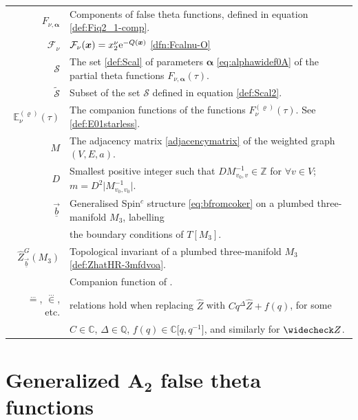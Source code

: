 \documentclass[10pt,a4paper]{amsart}
\def\BE{\mathbb{E}}
\def\CF{\mathcal{F}}
\def\CS{\mathcal{S}}
\def\ss{ \tilde{\mathcal{S}} }
\newcommand{\CC}{\mathbb{C}}
\newcommand{\QQ}{\mathbb{Q}}
\def\bos{\varrho}
\def\bal{\boldsymbol{\alpha}}
\theoremstyle{definition}
\numberwithin{equation}{section}
\begin{document}
\begin{table}[!ht]
\begin{tabular}{r l}
 $F_{\nu,\bal}$ & Components of false theta functions, defined in equation \eqref{def:Fiq2_1-comp}.
		\\
 $\CF_\nu$ & $\CF_\nu(\boldsymbol{x})=x_2^\nu {\rm e}^{-Q(\boldsymbol{x})}$ \eqref{dfn:Fcalnu-O} \\
		$\CS$ & The set \eqref{def:Scal} of parameters $\bal$ \eqref{eq:alphawidef0A} of the partial theta functions $F_{\nu,\bal}(\tau)$. \\
 $\ss$ & Subset of the set $\CS$ defined in equation \eqref{def:Scal2}.
		\\
		$\BE_\nu^{(\bos)}(\tau)$ & The companion functions of the functions $F_\nu^{(\bos)}(\tau)$. See \eqref{def:E01starless}.
 \\
		$M$ & The adjacency matrix \eqref{adjacencymatrix} of the weighted graph $(V,E,a)$.
		\\
		$D$ & Smallest positive integer such that $D M^{-1}_{v_0,v}\in\mathbb{Z}$ for $\forall  v\in V$; $m=D^2 \big|M^{-1}_{v_0,v_0}\big|$.
		\\
		$\vec{\underline{b}}$ & Generalised Spin$^c$ structure \eqref{eq:bfromcoker} on a plumbed three-manifold $M_3$, labelling \\
 & the boundary conditions of $T[M_3]$.
 \\
		$\widehat{Z}_{\vec{\underline{b}}}^G(M_3)$ & Topological invariant of a plumbed three-manifold $M_3$ \eqref{def:ZhatHR-3mfdvoa}.
		\\		\smash{$\widecheck{Z}_{\vec{\underline{b}}}^G(M_3)$} & Companion function of \smash{$\widehat{Z}_{\vec{\underline{b}}}^G(M_3)$}. \\
 $\stackrel{\dots}{=}$, $\stackrel{\dots}{\in}$, etc. & relations hold when replacing $\widehat Z$ with $Cq^{\Delta}\widehat Z+f(q)$, for some \\
 & $C\in \CC$, $\Delta\in \QQ$, $f(q)\in \CC\big[q,q^{-1}\big]$, and similarly for $\widecheck Z$.
	\end{tabular}
\end{table}


\section[Generalized A\_2 false theta functions]{Generalized $\boldsymbol{A_2}$ false theta functions}\label{sec:gena2}
\end{document}
